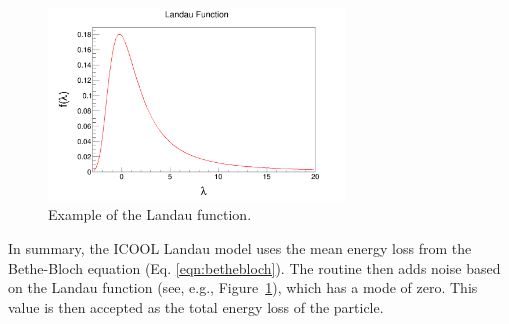 \begin{figure}[h!]
  \centering
    \includegraphics[width=0.7\textwidth]{"Figures/landau example"} 
  \caption[Example of the Landau function.]{Example of the Landau function.}
  \label{fig:landau_example}
\end{figure}

In summary, the ICOOL Landau model uses the mean energy loss from the Bethe-Bloch equation (Eq. \eqref{eqn:bethebloch}). The routine then adds noise based on the Landau function (see, e.g., Figure~\ref{fig:landau_example}), which has a mode of zero. This value is then accepted as the total energy loss of the particle.

